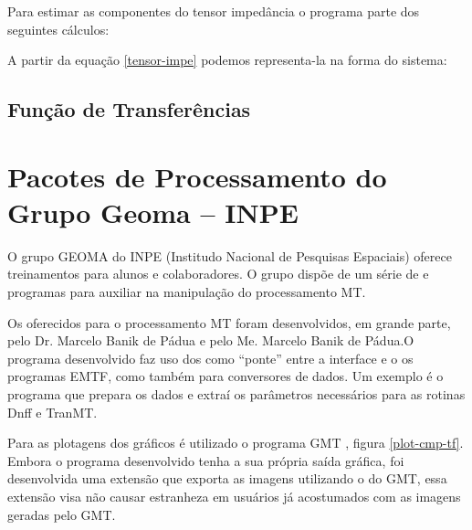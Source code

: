             Para estimar as componentes do tensor impedância o programa parte dos seguintes cálculos:
            
            A partir da equação \ref{tensor-impe} podemos representa-la na forma do sistema:
            
        \subsection{Função de Transferências}
           
           \cite{robusto-egbert}
           
    \section{Pacotes de Processamento do Grupo Geoma -- INPE}
    
        O grupo GEOMA do INPE (Institudo Nacional de Pesquisas Espaciais) oferece treinamentos para alunos e colaboradores. O grupo dispõe de um série de  e programas para auxiliar na manipulação do processamento MT.

        Os  oferecidos para o processamento MT foram desenvolvidos, em grande parte, pelo Dr. Marcelo Banik de Pádua e pelo Me. Marcelo Banik de Pádua.O programa desenvolvido faz uso dos  como ``ponte'' entre a interface e o os programas EMTF, como também para conversores de dados. Um exemplo é o programa  que prepara os dados e extraí os parâmetros necessários para as rotinas Dnff e TranMT. 
        
        Para as plotagens dos gráficos é utilizado o programa GMT \cite{gmt}, figura \ref{plot-cmp-tf}. Embora o programa desenvolvido tenha a sua própria saída gráfica, foi desenvolvida uma extensão que exporta as imagens utilizando o  do GMT, essa extensão visa não causar estranheza em usuários já acostumados com as imagens geradas pelo GMT.  
    
